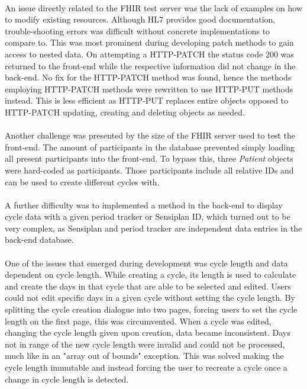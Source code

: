 \documentclass[
a4paper,
11pt
]{article}
\begin{document}
	\\%
	An issue directly related to the \ac{FHIR} test server was the lack of examples on how to modify existing resources. Although \ac{HL7} provides good documentation, trouble-shooting errors was difficult without concrete implementations to compare to. This was most prominent during developing patch methods to gain access to nested data. On attempting a \ac{HTTP}-PATCH the status code 200 was returned to the front-end while the respective information did not change in the back-end. No fix for the \ac{HTTP}-PATCH method was found, hence the methods employing \ac{HTTP}-PATCH methods were rewritten to use \ac{HTTP}-PUT methods instead. This is less efficient as \ac{HTTP}-PUT replaces entire objects opposed to \ac{HTTP}-PATCH updating, creating and deleting objects as needed.
	\\
	\\%
	Another challenge was presented by the size of the \ac{FHIR} server used to test the front-end. The amount of participants in the database prevented simply loading all present participants into the front-end. To bypass this, three \textit{Patient} objects were hard-coded as participants.
	Those participants include all relative IDs and can be used to create different cycles with.
	\\
	\\%
	A further difficulty was to implemented a method in the back-end to display cycle data with a given period tracker or Sensiplan\textsuperscript{\textcopyright} ID, which turned out to be very complex, as Sensiplan\textsuperscript{\textcopyright} and period tracker are independent data entries in the back-end database.
	\\
	\\%
	One of the issues that emerged during development was cycle length and data dependent on cycle length. While creating a cycle, its length is used to calculate and create the days in that cycle that are able to be selected and edited. Users could not edit specific days in a given cycle without setting the cycle length. By splitting the cycle creation dialogue into two pages, forcing users to set the cycle length on the first page, this was circumvented. When a cycle was edited, changing the cycle length given upon creation, data became inconsistent. Days not in range of the new cycle length were invalid and could not be processed, much like in an "array out of bounds" exception. This was solved making the cycle length immutable and instead forcing the user to recreate a cycle once a change in cycle length is detected.
\end{document}
